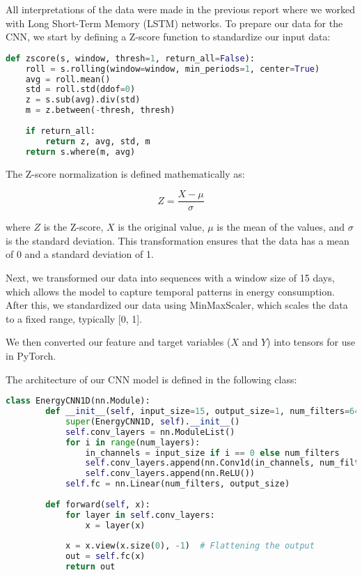 \documentclass{article}
\begin{document}
All interpretations of the data were made in the previous report where we worked with Long Short-Term Memory (LSTM) networks. To prepare our data for the CNN, we start by defining a Z-score function to standardize our input data:

\begin{lstlisting}[language=Python,]
def zscore(s, window, thresh=1, return_all=False):
    roll = s.rolling(window=window, min_periods=1, center=True)
    avg = roll.mean()
    std = roll.std(ddof=0)
    z = s.sub(avg).div(std)
    m = z.between(-thresh, thresh)
    
    if return_all:
        return z, avg, std, m
    return s.where(m, avg)
\end{lstlisting}

The Z-score normalization is defined mathematically as:

\begin{center}
\[
Z = \frac{X - \mu}{\sigma}
\]
\end{center}

where \(Z\) is the Z-score, \(X\) is the original value, \(\mu\) is the mean of the values, and \(\sigma\) is the standard deviation. This transformation ensures that the data has a mean of 0 and a standard deviation of 1.

Next, we transformed our data into sequences with a window size of 15 days, which allows the model to capture temporal patterns in energy consumption. After this, we standardized our data using MinMaxScaler, which scales the data to a fixed range, typically [0, 1].

We then converted our feature and target variables (\(X\) and \(Y\)) into tensors for use in PyTorch.

The architecture of our CNN model is defined in the following class:

\begin{minipage}{\textwidth}
    \begin{lstlisting}[language=Python,]
    class EnergyCNN1D(nn.Module):
        def __init__(self, input_size=15, output_size=1, num_filters=64, kernel_size=1, num_layers=1):
            super(EnergyCNN1D, self).__init__()
            self.conv_layers = nn.ModuleList()
            for i in range(num_layers):
                in_channels = input_size if i == 0 else num_filters
                self.conv_layers.append(nn.Conv1d(in_channels, num_filters, kernel_size=kernel_size))
                self.conv_layers.append(nn.ReLU())
            self.fc = nn.Linear(num_filters, output_size)
    
        def forward(self, x):
            for layer in self.conv_layers:
                x = layer(x)
            
            x = x.view(x.size(0), -1)  # Flattening the output
            out = self.fc(x)
            return out
    \end{lstlisting}
    \end{minipage}
\end{document}
